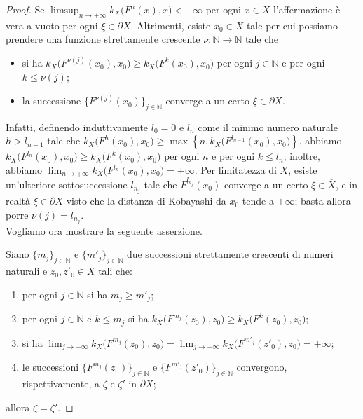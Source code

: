 \begin{proof}
    Se $\displaystyle\limsup_{n\longrightarrow+\infty}k_X\big(F^n(x),x\big)<+\infty$ per ogni $x\in X$ l'affermazione è vera a vuoto per ogni $\xi\in\partial X$. Altrimenti, esiste $x_0\in X$ tale per cui possiamo prendere una funzione strettamente crescente $\nu:\mathbb{N}\longrightarrow\mathbb{N}$ tale che
    \begin{itemize}
        \item si ha $k_X\big(F^{\nu(j)}(x_0),x_0\big) \ge k_X\big(F^k(x_0),x_0\big)$ per ogni $j \in \mathbb{N}$ e per ogni $k \le \nu(j)$;
        \item la successione $\{F^{\nu(j)}(x_0)\}_{j\in\mathbb{N}}$ converge a un certo $\xi\in\partial X$.
    \end{itemize}
    
    Infatti, definendo induttivamente $l_0=0$ e $l_n$ come il minimo numero naturale $h>l_{n-1}$ tale che $k_X\big(F^h(x_0),x_0\big) \ge \max\left\{n,k_X\big(F^{l_{n-1}}(x_0),x_0\big)\right\}$, abbiamo $k_X\big(F^{l_n}(x_0),x_0\big) \ge k_X\big(F^k(x_0),x_0\big)$ per ogni $n$ e per ogni $k \le l_n$; inoltre, abbiamo $\displaystyle\lim_{n\longrightarrow+\infty}k_X\big(F^{l_n}(x_0),x_0\big)=+\infty$. Per limitatezza di $X$, esiste un'ulteriore sottosuccessione $l_{n_j}$ tale che $F^{l_{n_j}}(x_0)$ converge a un certo $\xi\in\overline{X}$, e in realtà $\xi\in\partial X$ visto che la distanza di Kobayashi da $x_0$ tende a $+\infty$; basta allora porre $\nu(j)=l_{n_j}$.\\

    Vogliamo ora mostrare la seguente asserzione.

    Siano $\{m_j\}_{j\in\mathbb{N}}$ e $\{m'_j\}_{j\in\mathbb{N}}$ due successioni strettamente crescenti di numeri naturali e $z_0,z'_0\in X$ tali che:
    \begin{enumerate}[label={(\arabic*)}]
        \item per ogni $j\in\mathbb{N}$ si ha $m_j \ge m'_j$;
        \item per ogni $j\in\mathbb{N}$ e $k \le m_j$ si ha $k_X\big(F^{m_j}(z_0),z_0\big) \ge k_X\big(F^k(z_0),z_0\big)$;
        \item si ha $\displaystyle\lim_{j\longrightarrow+\infty}k_X\big(F^{m_j}(z_0),z_0\big)=\lim_{j\longrightarrow+\infty}k_X\big(F^{m'_j}(z'_0),z_0\big)=+\infty$;
        \item le successioni $\{F^{m_j}(z_0)\}_{j\in\mathbb{N}}$ e $\{F^{m'_j}(z'_0)\}_{j\in\mathbb{N}}$ convergono, rispettivamente, a $\zeta$ e $\zeta'$ in $\partial X$;
    \end{enumerate}
    allora $\zeta=\zeta'$.


\end{proof}
